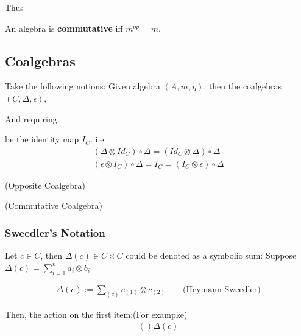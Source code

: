 \documentclass[Total.tex]{subfiles}
\begin{document}
		Thus
		\begin{Def}
			An algebra is \textbf{commutative} iff $m^{op}=m$.
		\end{Def}
		\subsection{Coalgebras}
			\begin{Def}
				Take the following notions: Given algebra $(A,m,\eta)$, then the coalgebras $(C,\Delta, \epsilon)$,
				\begin{center}
				\end{center}
				
				And requiring
				\begin{center}
				\end{center}
				
				be the identity map $I_C$. i.e.
				\begin{gather*}
					(\Delta\otimes Id_C)\circ \Delta=(Id_C\otimes \Delta)\circ \Delta\\
					(\epsilon\otimes I_C)\circ \Delta=I_C=(I_C\otimes \epsilon)\circ \Delta
				\end{gather*}
			\end{Def}
			
			\begin{Def}
				(Opposite Coalgebra)
			\end{Def}
			
			\begin{Def}
				(Commutative Coalgebra)
			\end{Def}
			\subsubsection{Sweedler's Notation}
			\begin{Def}
				Let $c\in C$, then $\Delta(c)\in C\times C$ could be denoted as a symbolic sum: Suppose $\Delta(c)=\sum_{i=1}^n a_i\otimes b_i$
				
				\begin{gather*}
					\Delta(c):=\sum_{(c)} c_{(1)}\otimes c_{(2)} \qquad\mbox{(Heymann-Sweedler)}
				\end{gather*}
				
				Then, the action on the first item:(For exampke)
				\begin{gather*}
					()\Delta(c)
				\end{gather*}
			\end{Def}
			
\end{document}
